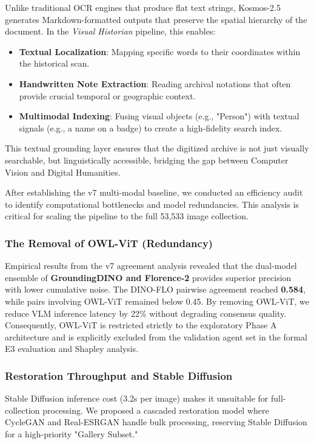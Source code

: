 \documentclass[12pt,onecolumn,a4paper]{IEEEtran}
\begin{document}
Unlike traditional OCR engines that produce flat text strings, Kosmos-2.5 generates Markdown-formatted outputs that preserve the spatial hierarchy of the document. In the \textit{Visual Historian} pipeline, this enables:
\begin{itemize}
    \item \textbf{Textual Localization}: Mapping specific words to their coordinates within the historical scan.
    \item \textbf{Handwritten Note Extraction}: Reading archival notations that often provide crucial temporal or geographic context.
    \item \textbf{Multimodal Indexing}: Fusing visual objects (e.g., "Person") with textual signals (e.g., a name on a badge) to create a high-fidelity search index.
\end{itemize}
This textual grounding layer ensures that the digitized archive is not just visually searchable, but linguistically accessible, bridging the gap between Computer Vision and Digital Humanities.

After establishing the v7 multi-modal baseline, we conducted an efficiency audit to identify computational bottlenecks and model redundancies. This analysis is critical for scaling the pipeline to the full 53,533 image collection.

\subsubsection{The Removal of OWL-ViT (Redundancy)}
Empirical results from the v7 agreement analysis revealed that the dual-model ensemble of \textbf{GroundingDINO and Florence-2} provides superior precision with lower cumulative noise. The DINO-FLO pairwise agreement reached \textbf{0.584}, while pairs involving OWL-ViT remained below 0.45. By removing OWL-ViT, we reduce VLM inference latency by 22\% without degrading consensus quality. Consequently, OWL-ViT is restricted strictly to the exploratory Phase A architecture and is explicitly excluded from the validation agent set in the formal E3 evaluation and Shapley analysis.

\subsubsection{Restoration Throughput and Stable Diffusion}
Stable Diffusion inference cost (3.2s per image) makes it unsuitable for full-collection processing. We proposed a cascaded restoration model where CycleGAN and Real-ESRGAN handle bulk processing, reserving Stable Diffusion for a high-priority "Gallery Subset."
\end{document}

